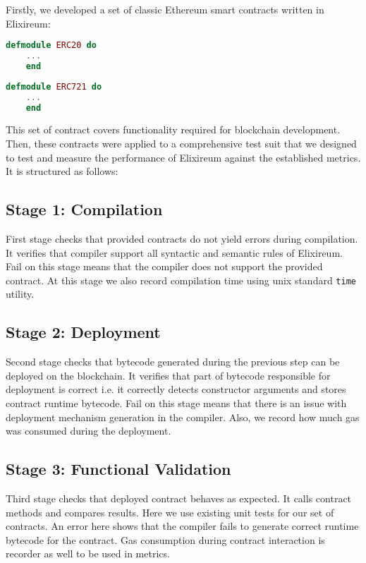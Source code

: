 Firstly, we developed a set of classic Ethereum smart contracts written in Elixireum:

\pagebreak

\begin{lstlisting}[caption={ERC-20.exm}, language=elixir]
    defmodule ERC20 do
    ...
    end
    \end{lstlisting}
    
\begin{lstlisting}[caption={ERC-721.exm}, language=elixir]
    defmodule ERC721 do
    ... 
    end
    \end{lstlisting}

This set of contract covers functionality required for blockchain development. Then, these contracts were applied to a comprehensive test suit that we designed to test and measure the performance of Elixireum against the established metrics. It is structured as follows:

\subsection*{Stage 1: Compilation}
First stage checks that provided contracts do not yield errors during compilation. It verifies that compiler support all syntactic and semantic rules of Elixireum. Fail on this stage means that the compiler does not support the provided contract. At this stage we also record compilation time using unix standard \verb|time| utility.

\subsection*{Stage 2: Deployment}
Second stage checks that bytecode generated during the previous step can be deployed on the blockchain. It verifies that part of bytecode responsible for deployment is correct i.e. it correctly detects constructor arguments and stores contract runtime bytecode. Fail on this stage means that there is an issue with deployment mechanism generation in the compiler. Also, we record how much gas was consumed during the deployment.

\subsection*{Stage 3: Functional Validation}
Third stage checks that deployed contract behaves as expected. It calls contract methods and compares results. Here we use existing unit tests for our set of contracts. An error here shows that the compiler fails to generate correct runtime bytecode for the contract. Gas consumption during contract interaction is recorder as well to be used in metrics.

